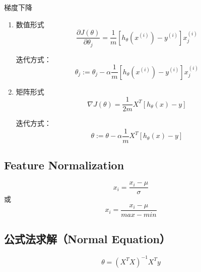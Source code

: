 梯度下降
\begin{enumerate}
\item 数值形式
\begin{equation}
	\frac{\partial J(\theta)}{\partial \theta_j} =
	    \frac{1}{m} [ h_\theta(x^{(i)}) - y^{(i)} ] x_j^{(i)}
\end{equation}

迭代方式：
\begin{equation}
	\theta_j := \theta_j - \alpha \frac{1}{m} [h_\theta(x^{(i)}) - y^{(i)}] x_j^{(i)}
\end{equation}

\item 矩阵形式
\begin{equation}
	\nabla J(\theta) = \frac{1}{2m} X^T [h_\theta(x) - y]
\end{equation}

迭代方式：
\begin{equation}
	\theta := \theta - \alpha \frac{1}{m} X^T [ h_\theta(x) - y]
\end{equation}
\end{enumerate}



\subsection{Feature Normalization}
\begin{equation}
	x_i = \frac{x_i - \mu}{\sigma}
\end{equation}
或
\begin{equation}
	x_i = \frac{x_i - \mu}{max - min}
\end{equation}



\subsection{公式法求解（Normal Equation）}
\begin{equation}
	\theta = (X^T X)^{-1} X^T y
\end{equation}















